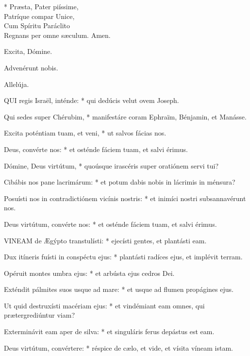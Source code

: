 * Præsta, Pater piíssime,\\
Patríque compar Unice,\\
Cum Spíritu Paráclito\\
Regnans per omne sæculum. Amen.

  Excita, Dómine.



 Advenérunt nobis.

  Allelúja.


\lettrine[lines=2]{Q}{UI} regis Israël, inténde: * qui dedúcis velut ovem Joseph.

Qui sedes super Chérubim, * manifestáre coram Ephraïm, Bénjamin, et Manásse.

Excita poténtiam tuam, et veni, * ut salvos fácias nos.

Deus, convérte nos: * et osténde fáciem tuam, et salvi érimus.

Dómine, Deus virtútum, * quoúsque irascéris super oratiónem servi tui?

Cibábis nos pane lacrimárum: * et potum dabis nobis in lácrimis in ménsura?

Posuísti nos in contradictiónem vicínis nostris: * et inimíci nostri subsannavérunt nos.

Deus virtútum, convérte nos: * et osténde fáciem tuam, et salvi érimus.


\lettrine[lines=2]{V}{INEAM} de Ægýpto transtulísti: * ejecísti gentes, et plantásti eam.

Dux itíneris fuísti in conspéctu ejus: * plantásti radíces ejus, et implévit terram.

Opéruit montes umbra ejus: * et arbústa ejus cedros Dei.

Exténdit pálmites suos usque ad mare: * et usque ad flumen propágines ejus.

Ut quid destruxísti macériam ejus: * et vindémiant eam omnes, qui prætergrediúntur viam?

Exterminávit eam aper de silva: * et singuláris ferus depástus est eam.

Deus virtútum, convértere: * réspice de cælo, et vide, et vísita víneam istam.

